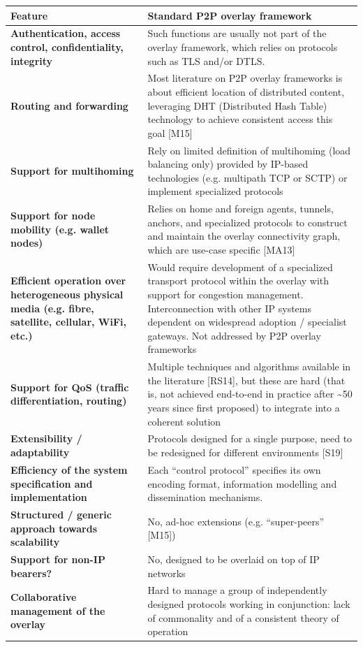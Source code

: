 \documentclass[11pt,a4paper]{article}
\begin{document}
\begin{longtable}[]{@{}ll@{}}
\toprule
Feature & Standard P2P overlay framework\tabularnewline
\midrule
\endhead
\textbf{Authentication, access control, confidentiality, integrity} &
Such functions are usually not part of the overlay framework, which
relies on protocols such as TLS and/or DTLS.\tabularnewline
\textbf{Routing and forwarding} & Most literature on P2P overlay
frameworks is about efficient location of distributed content,
leveraging DHT (Distributed Hash Table) technology to achieve consistent
access this goal {[}M15{]}\tabularnewline
\textbf{Support for multihoming} & Rely on limited definition of
multihoming (load balancing only) provided by IP-based technologies
(e.g. multipath TCP or SCTP) or implement specialized
protocols\tabularnewline
\textbf{Support for node mobility (e.g. wallet nodes)} & Relies on home
and foreign agents, tunnels, anchors, and specialized protocols to
construct and maintain the overlay connectivity graph, which are
use-case specific {[}MA13{]}\tabularnewline
\textbf{Efficient operation over heterogeneous physical media (e.g.
fibre, satellite, cellular, WiFi, etc.)} & Would require development of
a specialized transport protocol within the overlay with support for
congestion management. Interconnection with other IP systems dependent
on widespread adoption / specialist gateways. Not addressed by P2P
overlay frameworks\tabularnewline
\textbf{Support for QoS (traffic differentiation, routing)} & Multiple
techniques and algorithms available in the literature {[}RS14{]}, but
these are hard (that is, not achieved end-to-end in practice after
\textasciitilde{}50 years since first proposed) to integrate into a
coherent solution\tabularnewline
\textbf{Extensibility / adaptability} & Protocols designed for a single
purpose, need to be redesigned for different environments
{[}S19{]}\tabularnewline
\textbf{Efficiency of the system specification and implementation} &
Each ``control protocol'' specifies its own encoding format, information
modelling and dissemination mechanisms.\tabularnewline
\textbf{Structured / generic approach towards scalability} & No, ad-hoc
extensions (e.g. ``super-peers'' {[}M15{]})\tabularnewline
\textbf{Support for non-IP bearers?} & No, designed to be overlaid on
top of IP networks\tabularnewline
\textbf{Collaborative management of the overlay} & Hard to manage a
group of independently designed protocols working in conjunction: lack
of commonality and of a consistent theory of operation\tabularnewline
\bottomrule
\end{longtable}
\end{document}
